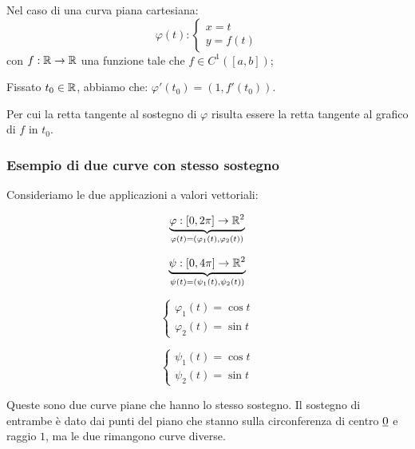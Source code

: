 Nel caso di una curva piana cartesiana:
\begin{equation*}
    \varphi(t):
    \begin{cases}
        x = t \\
        y = f(t)
    \end{cases}
\end{equation*}
con \(f: \mathbb{R} \to \mathbb{R} \) una funzione tale che \(f \in C^1([a,b])\);

Fissato \(t_0 \in \mathbb{R} \), abbiamo che: \(\varphi'(t_0) = (1,f'(t_0))\).

Per cui la retta tangente al sostegno di \(\varphi \) risulta essere la retta tangente al grafico di \(f\) in \(t_0\).

\filbreak{}

\subsubsection*{Esempio di due curve con stesso sostegno}

Consideriamo le due applicazioni a valori vettoriali:

\[
    \underbrace{\varphi:[0,2\pi] \rightarrow \mathbb{R}^{2}}_{\varphi(t) = (\varphi_1(t),\varphi_2(t))}
\]

\[
    \underbrace{\psi: [0,4\pi] \rightarrow \mathbb{R}^{2}}_{\psi(t) = (\psi_1(t),\psi_2(t))}
\]


\begin{equation*}
    \begin{cases}
        \varphi_1(t) = \cos t \\
        \varphi_2(t) = \sin t
    \end{cases}
\end{equation*}


\begin{equation*}
    \begin{cases}
        \psi_1(t) = \cos t \\
        \psi_2(t) = \sin t
    \end{cases}
\end{equation*}

Queste sono due curve piane che hanno lo stesso sostegno. Il sostegno di entrambe è dato dai punti del piano che stanno sulla circonferenza di centro \(\underline{0} \) e raggio \(1\), ma le due rimangono curve diverse.
